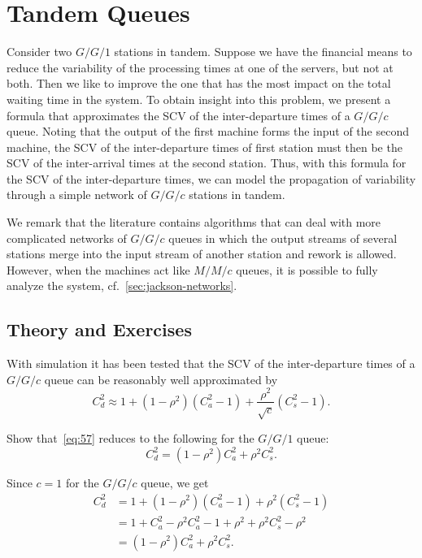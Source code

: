\section{Tandem Queues}
\label{sec:tandem-queues}


Consider two $G/G/1$ stations in tandem.
Suppose we have the financial means to reduce the variability of the processing times at one of the servers, but not at both.
Then we like to improve the one that has the most impact on the total waiting time in the system.
To obtain insight into this problem, we present a formula that approximates the SCV of the inter-departure times of a $G/G/c$ queue.
Noting that the output of the first machine forms the input of the second machine, the SCV of the inter-departure times of first station must then be the SCV of the inter-arrival times at the second station.
Thus, with this formula for the SCV of the inter-departure times, we can model the propagation of variability through a simple network of $G/G/c$ stations in tandem.

We remark that the literature contains algorithms that can deal with more complicated networks of $G/G/c$ queues in which the output streams of several stations merge into the input stream of another station and rework is allowed.
However, when the machines act like $M/M/c$ queues, it is possible to fully analyze the system, cf.~\cref{sec:jackson-networks}.

\subsection*{Theory and Exercises}


With simulation it has been tested that the SCV of the inter-departure times of a $G/G/c$ queue can be reasonably well approximated by
\begin{equation}\label{eq:57}
 C_{d}^2 \approx 1 + (1-\rho^2)(C_{a}^2-1) + \frac{\rho^2}{\sqrt{c}}(C_{s}^2-1).
\end{equation}


\begin{exercise}
 Show that~\cref{eq:57}  reduces to the following for the $G/G/1$ queue: 
\begin{equation}
 \label{eq:40}
 C_{d}^2 =  (1-\rho^2) C_{a}^2 + \rho^2 C_{s}^2.
\end{equation}
\begin{solution}
 Since $c=1$ for the $G/G/c$ queue, we get
\begin{align*}
 C_{d}^2 
&= 1 + (1-\rho^2)(C_{a}^2-1) + \rho^2(C_{s}^2-1) \\
&= 1 + C_a^2 - \rho^2 C_{a}^2 -1 + \rho^2 + \rho^2 C_{s}^2 -\rho^2 \\
&= (1-\rho^2) C_a^2 + \rho^2 C_{s}^2.
\end{align*}
\end{solution}
\end{exercise}

